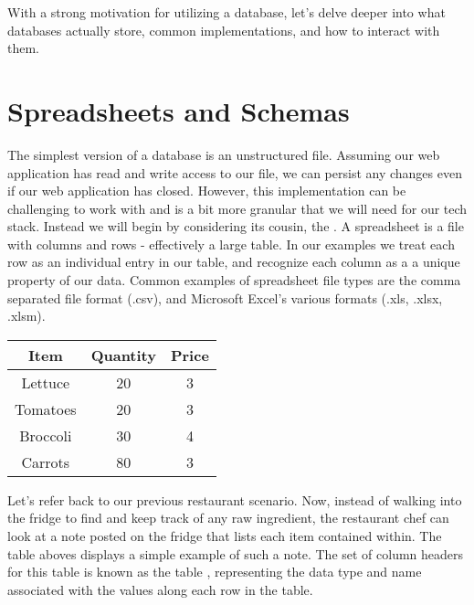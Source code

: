 With a strong motivation for utilizing a database, let's delve deeper into what databases actually store, common implementations, and how to interact with them. 


\section{Spreadsheets and Schemas}

The simplest version of a database is an unstructured file. Assuming our web application has read and write access to our file, we can persist any changes even if our web application has closed. However, this implementation can be challenging to work with and is a bit more granular that we will need for our tech stack. Instead we will begin by considering its cousin, the . A spreadsheet is a file with columns and rows - effectively a large table. In our examples we treat each row as an individual entry in our table, and recognize each column as a a unique property of our data. Common examples of spreadsheet file types are the comma separated file format (.csv), and Microsoft Excel's various formats (.xls, .xlsx, .xlsm).


\begin{center}
    \begin{tabular}{ |c|c|c| } 
        \hline
        \textbf{Item} & \textbf{Quantity} & \textbf{Price} \\ 
        \hline
        Lettuce & 20 & 3 \\ 
        \hline
        Tomatoes & 20 & 3 \\ 
        \hline
        Broccoli & 30 & 4 \\ 
        \hline
        Carrots & 80 & 3 \\ 
        \hline
    \end{tabular}
\end{center}

Let's refer back to our previous restaurant scenario. Now, instead of walking into the fridge to find and keep track of any raw ingredient, the restaurant chef can look at a note posted on the fridge that lists each item contained within. The table aboves displays a simple example of such a note. The set of column headers for this table is known as the table , representing the data type and name associated with the values along each row in the table.

